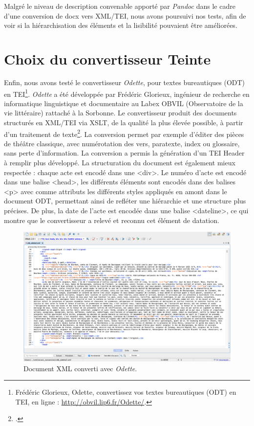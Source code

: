 \par Malgré le niveau de description convenable apporté par \textit{Pandoc} dans le cadre d’une conversion de docx vers XML/TEI, nous avons poursuivi nos tests, afin de voir si la hiérarchisation des éléments et la lisibilité pouvaient être améliorées. 

\newpage 

\section{Choix du convertisseur Teinte}
\label{II.4.3}

\par Enfin, nous avons testé le convertisseur \textit{Odette}, pour textes bureautiques (ODT) en TEI\footnote{Frédéric Glorieux, Odette, convertissez vos textes bureautiques (ODT) en TEI, en ligne : \url{http://obvil.lip6.fr/Odette/}.}. \textit{Odette} a été développée par Frédéric Glorieux, ingénieur de recherche en informatique linguistique et documentaire au Labex OBVIL (Observatoire de la vie littéraire) rattaché à la Sorbonne. Le convertisseur produit des documents structurés en XML/TEI via XSLT, de la qualité la plus élevée possible, à partir d’un traitement de texte\footnote{\cite{glorieuxTraitementTextesOdt2015}.}. La conversion permet par exemple d’éditer des pièces de théâtre classique, avec numérotation des vers, paratexte, index ou glossaire, sans perte d’information. La conversion a permis la génération d’un TEI Header à remplir plus développé. La structuration du document est également mieux respectée : chaque acte est encodé dans une <div>. Le numéro d’acte est encodé dans une balise <head>, les différents éléments sont encodés dans des balises <p> avec comme attributs les différents styles appliqués en amont dans le document ODT, permettant ainsi de refléter une hiérarchie et une structure plus précises. De plus, la date de l’acte est encodée dans une balise <dateline>, ce qui montre que le convertisseur a relevé et reconnu cet élément de datation.
\newline 

\begin{figure}[ht!]
    \centering
    \includegraphics[scale=0.31]{img/odette.png}
    \caption{Document XML converti avec \textit{Odette}.}
    \label{fig:odette}
\end{figure}

